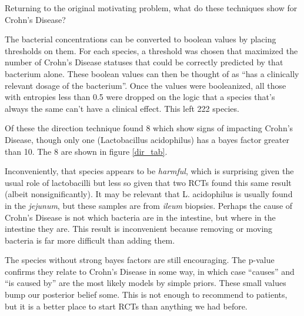 \documentclass[twocolumn,12pt]{article}
\begin{document}
Returning to the original motivating problem, what do these techniques
show for Crohn's Disease?

The bacterial concentrations can be converted to boolean values by
placing thresholds on them.  For each species, a threshold was chosen that
maximized the number of Crohn's Disease statuses that could be
correctly predicted by that bacterium alone.  These boolean values can
then be thought of as ``has a clinically relevant dosage of the
bacterium''.  Once the values were booleanized, all those with
entropies less than 0.5 were dropped on the logic that a species
that's always the same can't have a clinical effect.  This left 222
species.

Of these the direction technique found 8 which show signs of impacting
Crohn's Disease, though only one (Lactobacillus acidophilus) has a
bayes factor greater than 10.  The 8 are shown in figure \ref{dir_tab}.

Inconveniently, that species appears to
be \textit{harmful}, which is surprising given the usual role of
lactobacilli but less so given that two RCTs found this same result
(albeit nonsignificantly)\cite{lgg1,lgg2}.  It may be relevant that
L. acidophilus is usually found in the
\textit{jejunum}\cite{lacid}, but these samples are from
\textit{ileum} biopsies.  Perhaps the cause of Crohn's Disease is not
which bacteria are in the intestine, but where in the intestine they
are.  This result is inconvenient because removing or moving bacteria
is far more difficult than adding them.

The species without strong bayes factors are still encouraging.  The
p-value confirms they relate to Crohn's Disease in some way, in which
case ``causes'' and ``is caused by'' are the most likely models by
simple priors.  These small values bump our posterior belief some.
This is not enough to recommend to patients, but it is a better place
to start RCTs than anything we had before.

\newpage
\end{document}
